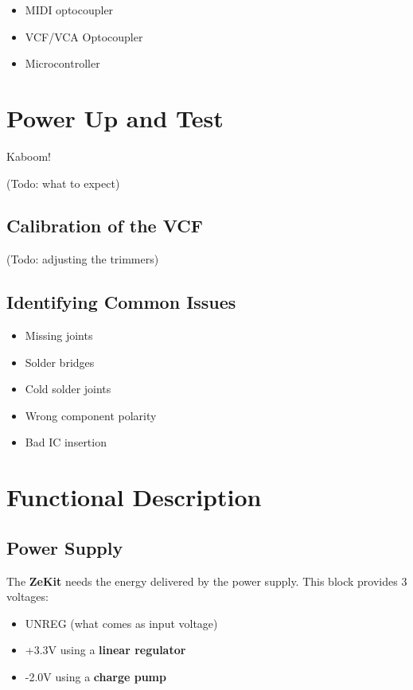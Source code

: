 \documentclass{scrartcl}
\begin{document}
\begin{itemize}
    \item MIDI optocoupler
    \item VCF/VCA Optocoupler
    \item Microcontroller
\end{itemize}

\pagebreak
\section{Power Up and Test}

Kaboom!

 (Todo: what to expect)

\subsection{Calibration of the VCF}

(Todo: adjusting the trimmers)

\subsection{Identifying Common Issues}

\begin{itemize}
    \item Missing joints
    \item Solder bridges
    \item Cold solder joints
    \item Wrong component polarity
    \item Bad IC insertion
\end{itemize}

\pagebreak

\section{Functional Description}

\subsection{Power Supply}

The \textbf{ZeKit} needs the energy delivered by the power supply.
This block provides 3 voltages: 
\begin{itemize}
    \item UNREG (what comes as input voltage)
    \item +3.3V using a \textbf{linear regulator}
    \item -2.0V using a \textbf{charge pump}
\end{itemize}
\end{document}
